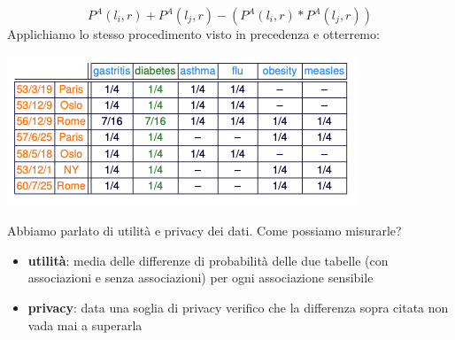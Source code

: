 \[ P^A(l_i,r) + P^A(l_j,r) - (P^A(l_i,r) * P^A(l_j,r))\]
Applichiamo lo stesso procedimento visto in precedenza e otterremo:
\begin{center}
    \includegraphics[scale=0.5]{img/exposure3.png}
\end{center}
Abbiamo parlato di utilità e privacy dei dati. Come possiamo misurarle?
\begin{itemize}
    \item \textbf{utilità}: media delle differenze di probabilità delle due tabelle (con associazioni e senza associazioni) per ogni associazione sensibile
    \item \textbf{privacy}: data una soglia di privacy verifico che la differenza sopra citata non vada mai a superarla
\end{itemize}